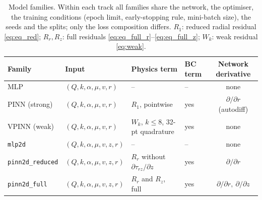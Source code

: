 \begin{table}[t]
\caption{Model families. Within each track all families share the network, the
optimiser, the training conditions (epoch limit, early-stopping rule,
mini-batch size), the seeds and the splits; only the loss composition differs. $R_1$: reduced radial residual
\eqref{eq:eq_red}; $R_r,R_z$: full residuals
\eqref{eq:eq_full_r}--\eqref{eq:eq_full_z}; $W_k$: weak residual \eqref{eq:weak}.}
\label{tab:families}
\centering\small
\begin{tabular}{@{}llllc@{}}
\toprule
Family & Input & Physics term & BC term & Network derivative \\
\midrule
MLP                     & $(Q,k,\alpha,\mu,v,r)$   & --                                        & --  & none \\
PINN (strong)           & $(Q,k,\alpha,\mu,v,r)$   & $R_1$, pointwise                          & yes & $\partial/\partial r$ (autodiff) \\
VPINN (weak)            & $(Q,k,\alpha,\mu,v,r)$   & $W_k$, $k\le8$, 32-pt quadrature          & yes & none \\
\texttt{mlp2d}          & $(Q,k,\alpha,\mu,v,z,r)$ & --                                        & --  & none \\
\texttt{pinn2d\_reduced}& $(Q,k,\alpha,\mu,v,z,r)$ & $R_r$ without $\partial\tau_{rz}/\partial z$ & yes & $\partial/\partial r$ \\
\texttt{pinn2d\_full}   & $(Q,k,\alpha,\mu,v,z,r)$ & $R_r$ and $R_z$, full                     & yes & $\partial/\partial r,\ \partial/\partial z$ \\
\bottomrule
\end{tabular}
\end{table}

